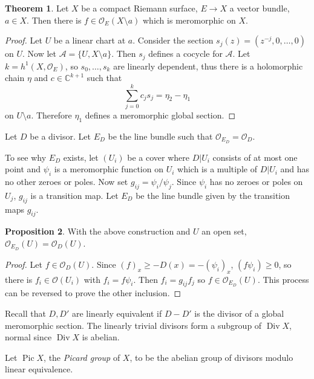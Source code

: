 \documentclass[12pt]{book}
\newcommand{\CC}{\mathbb{C}}
\newcommand{\Olo}{\mathscr O}
\DeclareMathOperator{\Div}{Div}
\DeclareMathOperator{\Pic}{Pic}
\newcommand{\dfn}[1]{\emph{#1}\index{#1}}
\theoremstyle{definition}
\newtheorem{theorem}{Theorem}[chapter]
\newtheorem{proposition}[theorem]{Proposition}
\newenvironment{definition}
  {\pushQED{\qed}\renewcommand{\qedsymbol}{$\diamondsuit$}\definitionx}
  {\popQED\endexamplex}
\begin{document}
\begin{theorem}
Let $X$ be a compact Riemann surface, $E \to X$ a vector bundle, $a \in X$.
Then there is $f \in \Olo_E(X \setminus a)$ which is meromorphic on $X$.
\end{theorem}
\begin{proof}
Let $U$ be a linear chart at $a$.
Consider the section $s_j(z) = (z^{-j}, 0, \dots, 0)$ on $U$.
Now let $\mathscr A = \{U, X \setminus a\}$.
Then $s_j$ defines a cocycle for $\mathscr A$.
Let $k = h^1(X, \Olo_E)$, so $s_0, \dots, s_k$ are linearly dependent, thus there is a holomorphic chain $\eta$ and $c \in \CC^{k+1}$ such that
$$\sum_{j=0}^k c_j s_j = \eta_2 - \eta_1$$
on $U \setminus a$.
Therefore $\eta_1$ defines a meromorphic global section.
\end{proof}

\begin{definition}
Let $D$ be a divisor. Let $E_D$ be the line bundle such that $\Olo_{E_D} = \Olo_D$.
\end{definition}

To see why $E_D$ exists, let $(U_i)$ be a cover where $D|U_i$ consists of at most one point and $\psi_i$ is a meromorphic function on $U_i$ which is a multiple of $D|U_i$ and has no other zeroes or poles.
Now set $g_{ij} = \psi_i/\psi_j$. Since $\psi_i$ has no zeroes or poles on $U_j$, $g_{ij}$ is a transition map.
Let $E_D$ be the line bundle given by the transition maps $g_{ij}$.

\begin{proposition}
With the above construction and $U$ an open set, $\Olo_{E_D}(U) = \Olo_D(U)$.
\end{proposition}
\begin{proof}
Let $f \in \Olo_D(U)$. Since $(f)_x \geq -D(x) = -(\psi_i)_x$, $(f\psi_i) \geq 0$, so there is $f_i \in \Olo(U_i)$ with $f_i = f\psi_i$.
Then $f_i = g_{ij}f_j$ so $f \in \Olo_{E_D}(U)$.
This process can be reversed to prove the other inclusion.
\end{proof}

Recall that $D,D'$ are linearly equivalent if $D - D'$ is the divisor of a global meromorphic section.
The linearly trivial divisors form a subgroup of $\Div X$, normal since $\Div X$ is abelian.

\begin{definition}
Let $\Pic X$, the \dfn{Picard group} of $X$, to be the abelian group of divisors modulo linear equivalence.
\end{definition}
\end{document}
